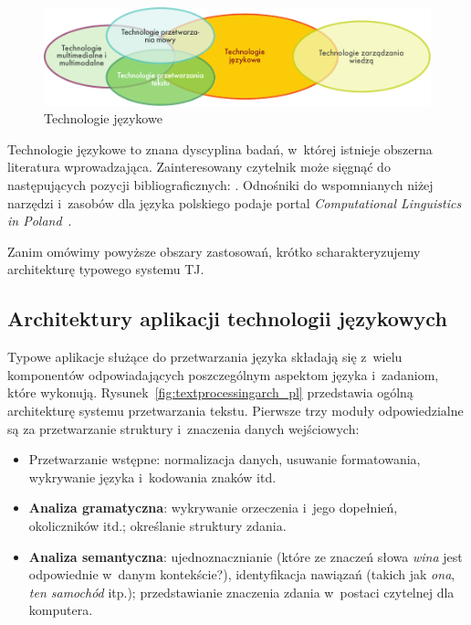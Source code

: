 \begin{multicols}{2}
\begin{figure}[htb]  \center
\includegraphics[width=\textwidth]{../_media/polish/language_technologies}
\caption{Technologie językowe} \label{fig:ltincontext_pl}
 \end{figure} 

Technologie językowe to znana dyscyplina badań, w~której istnieje
obszerna literatura wprowadzająca. Zainteresowany czytelnik może
sięgnąć do następujących pozycji bibliograficznych:
\cite{jurafsky-martin01, manning-schuetze1, lt-world1, lt-survey1,
mykowiecka1}. Odnośniki do wspomnianych niżej narzędzi i~zasobów
dla języka polskiego podaje portal \textit{Computational Linguistics
in Poland}~\cite{Clip2}. 

Zanim omówimy powyższe obszary zastosowań, krótko
scharakteryzujemy architekturę typowego systemu TJ. 

\subsection[Architektury aplikacji technologii
językowych]{Architektury aplikacji technologii językowych} Typowe
aplikacje służące do przetwarzania języka składają się z~wielu
komponentów odpowiadających poszczególnym aspektom języka
i~zadaniom, które wykonują. Rysunek~\ref{fig:textprocessingarch_pl}
przedstawia ogólną architekturę systemu przetwarzania tekstu.
Pierwsze trzy moduły odpowiedzialne są za przetwarzanie struktury
i~znaczenia danych wejściowych: 

\begin{itemize} \item Przetwarzanie wstępne: normalizacja danych,
usuwanie formatowania, wykrywanie języka i~kodowania znaków itd.
\item \textbf{Analiza gramatyczna}: wykrywanie orzeczenia i~jego
dopełnień, okoliczników itd.; określanie struktury zdania. \item
\textbf{Analiza semantyczna}: ujednoznacznianie (które ze znaczeń
słowa \emph{wina} jest odpowiednie w~danym kontekście?),
identyfikacja nawiązań (takich jak \emph{ona}, \emph{ten samochód}
itp.); przedstawianie znaczenia zdania w~postaci czytelnej dla
komputera. \end{itemize} 


\end{multicols}
